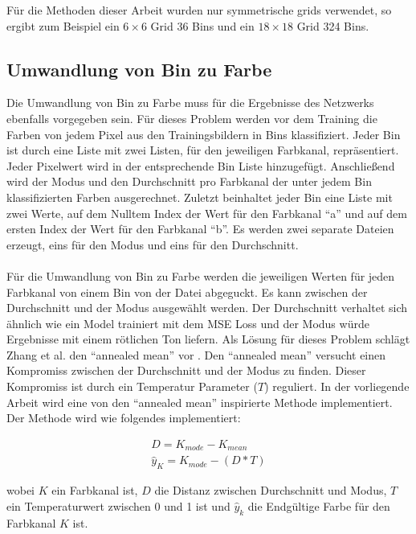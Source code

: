 Für die Methoden dieser Arbeit wurden nur symmetrische \gls{grid}s verwendet, so ergibt zum Beispiel ein $6 \times 6$ Grid 36 Bins und 
ein $18 \times 18$ Grid 324 Bins.

\subsection{Umwandlung von Bin zu Farbe}
Die Umwandlung von Bin zu Farbe muss für die Ergebnisse des Netzwerks ebenfalls vorgegeben sein. Für dieses Problem werden vor dem 
Training die Farben von jedem Pixel aus den Trainingsbildern in Bins klassifiziert. Jeder Bin ist durch eine Liste mit zwei Listen, 
für den jeweiligen Farbkanal, repräsentiert. Jeder Pixelwert wird in der entsprechende Bin Liste hinzugefügt. Anschließend wird der Modus 
und den Durchschnitt pro Farbkanal der unter jedem Bin klassifizierten Farben ausgerechnet. Zuletzt beinhaltet jeder Bin eine Liste mit zwei
Werte, auf dem Nulltem Index der Wert für den Farbkanal ``a'' und auf dem ersten Index der Wert für den Farbkanal ``b''. Es werden zwei separate
Dateien erzeugt, eins für den Modus und eins für den Durchschnitt.
\\
\\
Für die Umwandlung von Bin zu Farbe werden die jeweiligen Werten für jeden Farbkanal von einem Bin von der Datei abgeguckt. Es kann zwischen
der Durchschnitt und der Modus ausgewählt werden. Der Durchschnitt verhaltet sich ähnlich wie ein Model trainiert mit dem MSE Loss und der Modus
würde Ergebnisse mit einem rötlichen Ton liefern. Als Lösung für dieses Problem schlägt Zhang et al. den ``annealed mean'' vor \cite{zhang2016colorful}.
Den ``annealed mean'' versucht einen Kompromiss zwischen der Durchschnitt und der Modus zu finden. Dieser Kompromiss ist durch ein 
Temperatur Parameter ($T$) reguliert. In der vorliegende Arbeit wird eine von den ``annealed mean'' inspirierte Methode implementiert. 
Der Methode wird wie folgendes implementiert:

\begin{equation}
  \begin{gathered}
    D = K_{mode} - K_{mean} \\
    \hat{y}_{K} = K_{mode} - (D * T)
  \end{gathered}
\end{equation}

wobei $K$ ein Farbkanal ist, $D$ die Distanz zwischen Durchschnitt und Modus, $T$ ein Temperaturwert zwischen 0 und 1 ist und $\hat{y}_{k}$ die
Endgültige Farbe für den Farbkanal $K$ ist.


